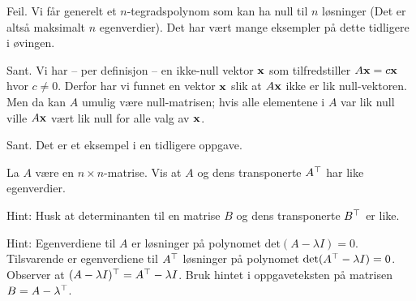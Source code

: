 \begin{losning}

\begin{punkt}
Feil. Vi får generelt et $n$-tegradspolynom som kan ha null til $n$ løsninger (Det er altså maksimalt $n$ egenverdier). Det har vært mange eksempler på dette tidligere i øvingen.
\end{punkt}

\begin{punkt}
Sant. Vi har -- per definisjon -- en ikke-null vektor $\mathbf{x}$ som tilfredstiller $A\mathbf{x}=c\mathbf{x}$ hvor $c\neq 0$. Derfor har vi funnet en vektor $\mathbf{x}$ slik at $A\mathbf{x}$ ikke er lik null-vektoren. Men da kan $A$ umulig være null-matrisen; hvis alle elementene i $A$ var lik null ville $A\mathbf{x}$ vært lik null for alle valg av $\mathbf{x}$.
\end{punkt}


\begin{punkt}
Sant. Det er et eksempel i en tidligere oppgave.
\end{punkt}

\end{losning}

\begin{oppgave}
La $A$ være en $n\times n$-matrise. Vis at $A$ og dens transponerte $A^\top$ har like egenverdier.

\noindent
Hint: Husk at determinanten til en matrise $B$ og dens transponerte $B^\top$ er like.
\end{oppgave}

\begin{losning}
Hint: Egenverdiene til $A$ er løsninger på polynomet $\text{det}(A-\lambda I)=0$. Tilsvarende er egenverdiene til $A^\top$ løsninger på polynomet $\text{det}(A^\top-\lambda I)=0$. Observer at $(A-\lambda I)^\top=A^\top-\lambda I$. Bruk hintet i oppgaveteksten på matrisen $B=A-\lambda^\top$.
\end{losning}


